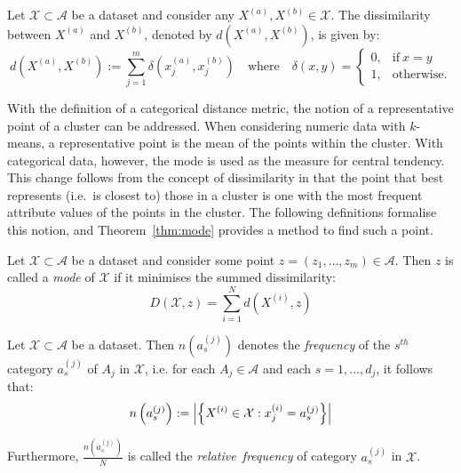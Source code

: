 \begin{definition}\label{def:dissim}
    Let \(\mathcal{X} \subset \mathcal A\) be a dataset and consider any
    \(X^{(a)}, X^{(b)} \in \mathcal{X}\). The dissimilarity between \(X^{(a)}\)
    and \(X^{(b)}\), denoted by \(d\left(X^{(a)}, X^{(b)}\right)\), is given by:
    \begin{equation}\label{eq:dissim}
        d\left(X^{(a)}, X^{(b)}\right) := \sum_{j=1}^{m} \delta\left(x_j^{(a)},
        x_j^{(b)}\right) \quad \text{where} \quad \delta\left(x, y\right) =
        \begin{cases}
            0, & \text{if} \ x = y \\
            1, & \text{otherwise.}
        \end{cases}
    \end{equation}
\end{definition}

With the definition of a categorical distance metric, the notion of a
representative point of a cluster can be addressed. When considering numeric
data with \(k\)-means, a representative point is the mean of the points within
the cluster. With categorical data, however, the mode is used as the measure for
central tendency. This change follows from the concept of dissimilarity in that
the point that best represents (i.e.\ is closest to) those in a cluster is one
with the most frequent attribute values of the points in the cluster. The
following definitions formalise this notion, and Theorem~\ref{thm:mode} provides
a method to find such a point.

\begin{definition}\label{def:mode}
    Let \(\mathcal{X} \subset \mathcal{A}\) be a dataset and consider some point
    \(z = \left(z_1, \ldots, z_m\right) \in \mathcal{A}\). Then \(z\) is called
    a \emph{mode} of \(\mathcal{X}\) if it minimises the summed dissimilarity:
    \begin{equation}\label{eq:summed-dissim}
        D\left(\mathcal{X}, z\right) = \sum_{i=1}^{N} d\left(X^{(i)}, z\right)
    \end{equation}
\end{definition}

\begin{definition}\label{def:rel-freq}
    Let \(\mathcal{X} \subset \mathcal{A}\) be a dataset. Then
    \(n\left(a_s^{(j)}\right)\) denotes the \emph{frequency} of the \(s^{th}\)
    category \(a_s^{(j)}\) of \(A_j\) in \(\mathcal{X}\), i.e. for each \(A_j
    \in \mathcal{A}\) and each \(s = 1, \ldots, d_j\), it follows that:
    \begin{equation}
        n\left(a_s^{(j)}\right) := \abs*{%
            {\left\{X^{(i)} \in \mathcal{X}: x_j^{(i)} = a_s^{(j)}\right\}}
        }
    \end{equation}

    Furthermore, \(\frac{n\left(a_s^{(j)}\right)}{N}\) is called the
    \emph{relative~frequency} of category \(a_s^{(j)}\) in \(\mathcal{X}\).
\end{definition}

